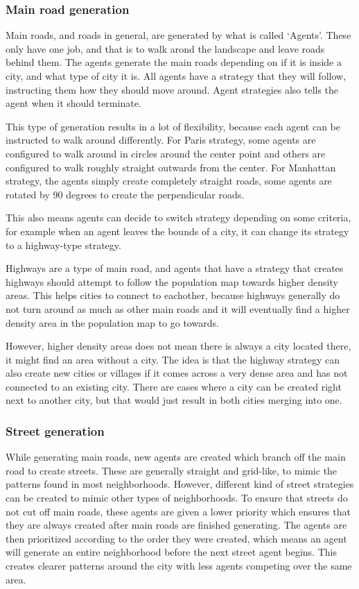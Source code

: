 \subsubsection{Main road generation}
Main roads, and roads in general, are generated by what is called `Agents'.
These only have one job, and that is to walk arond the landscape and leave roads behind them.
The agents generate the main roads depending on if it is inside a city, and what type of city it is.
All agents have a strategy that they will follow, instructing them how they should move around.
Agent strategies also tells the agent when it should terminate.

This type of generation results in a lot of flexibility, because each agent can be instructed to walk around differently.
For Paris strategy, some agents are configured to walk around in circles around the center point and others are configured to walk roughly straight outwards from the center.
For Manhattan strategy, the agents simply create completely straight roads, some agents are rotated by 90 degrees to create the perpendicular roads.

This also means agents can decide to switch strategy depending on some criteria, for example when an agent leaves the bounds of a city, it can change its strategy to a highway-type strategy.

Highways are a type of main road, and agents that have a strategy that creates highways should attempt to follow the population map towards higher density areas.
This helps cities to connect to eachother, because highways generally do not turn around as much as other main roads and it will eventually find a higher density area in the population map to go towards.

However, higher density areas does not mean there is always a city located there, it might find an area without a city.
The idea is that the highway strategy can also create new cities or villages if it comes across a very dense area and has not connected to an existing city.
There are cases where a city can be created right next to another city, but that would just result in both cities merging into one.

\subsubsection{Street generation}
While generating main roads, new agents are created which branch off the main road to create streets.
These are generally straight and grid-like, to mimic the patterns found in most neighborhoods.
However, different kind of street strategies can be created to mimic other types of neighborhoods.
To ensure that streets do not cut off main roads, these agents are given a lower priority which ensures that they are always created after main roads are finished generating.
The agents are then prioritized according to the order they were created, which means an agent will generate an entire neighborhood before the next street agent begins.
This creates clearer patterns around the city with less agents competing over the same area.

